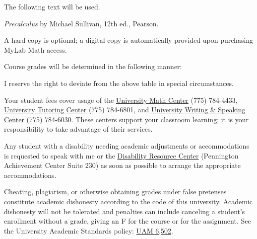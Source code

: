 \documentclass[a4paper]{syllabus}
\begin{document}
The following text will be used.

\textit{Precalculus} by Michael Sullivan, 12th ed., Pearson.

A hard copy is optional; a digital copy is automatically provided upon purchasing MyLab Math access.


Course grades will be determined in the following manner:


I reserve the right to deviate from the above table in special circumstances.


Your student fees cover usage of the \href{https://www.unr.edu/university-math-center}{University Math Center} (775) 784-4433, \href{https://www.unr.edu/tutoring-center}{University Tutoring Center} (775) 784-6801, and \href{https://www.unr.edu/writing-speaking-center}{University Writing \& Speaking Center} (775) 784-6030.
These centers support your classroom learning; it is your responsibility to take advantage of their services.

Any student with a disability needing academic adjustments or accommodations is requested to speak with me or the \href{https://www.unr.edu/drc}{Disability Resource Center} (Pennington Achievement Center Suite 230) as soon as possible to arrange the appropriate accommodations.

Cheating, plagiarism, or otherwise obtaining grades under false pretenses constitute academic dishonesty according to the code of this university.
Academic dishonesty will not be tolerated and penalties can include canceling a student's enrollment without a grade, giving an F for the course or for the assignment.
See the University Academic Standards policy: \href{https://www.unr.edu/administrative-manual/6000-6999-courses-curricula-and-organizational-change-process/6502-academic-standards}{UAM 6,502}.
\end{document}
